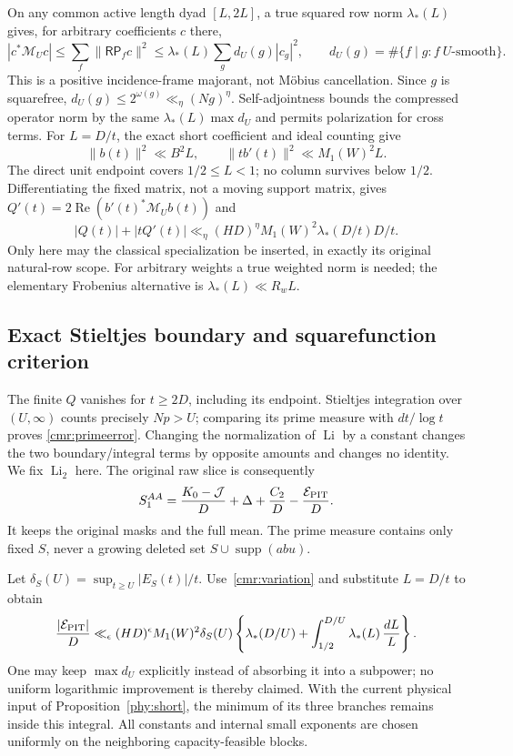 \documentclass[11pt]{article}
\theoremstyle{definition}\newtheorem{definition}[theorem]{Definition}
\theoremstyle{remark}\newtheorem{remark}[theorem]{Remark}
\begin{document}
On any common active length dyad $[L,2L]$, a true squared row norm
$\lambda_*(L)$ gives, for arbitrary coefficients $c$ there,
\[
 |c^*\mathcal M_Uc|
 \le\sum_f\|\mathsf R\mathsf P_fc\|^2
 \le\lambda_*(L)\sum_g d_U(g)|c_g|^2,
 \qquad d_U(g)=\#\{f\mid g:f\ U\text{-smooth}\}.
\]
This is a positive incidence-frame majorant, not M\"obius cancellation.
Since $g$ is squarefree, $d_U(g)\le2^{\omega(g)}\ll_\eta(Ng)^\eta$.
Self-adjointness bounds the compressed operator norm by the same
$\lambda_*(L)\max d_U$ and permits polarization for cross terms.
For $L=D/t$, the exact short coefficient and ideal counting give
\[
 \|b(t)\|^2\ll B^2L,\qquad
 \|tb'(t)\|^2\ll M_1(W)^2L.
\]
The direct unit endpoint covers $1/2\le L<1$; no column survives below
$1/2$. Differentiating the fixed matrix, not a moving support matrix,
gives $Q'(t)=2\operatorname{Re}(b'(t)^*\mathcal M_Ub(t))$ and
\begin{equation}\label{cmr:variation}
 |Q(t)|+|tQ'(t)|\ll_\eta(HD)^\eta
                     M_1(W)^2\lambda_*(D/t)D/t.
\end{equation}
Only here may the classical specialization be inserted, in exactly
its original natural-row scope. For arbitrary weights a true
weighted norm is needed; the elementary Frobenius alternative is
$\lambda_*(L)\ll R_wL$.

\subsection{Exact Stieltjes boundary and squarefunction criterion}
\label{cmr:stieltjes-proof}
The finite $Q$ vanishes for $t\ge2D$, including its endpoint.
Stieltjes integration over $(U,\infty)$ counts precisely $Np>U$;
comparing its prime measure with $dt/\log t$ proves
\eqref{cmr:primeerror}. Changing the normalization of $\operatorname{Li}$
by a constant changes the two boundary/integral terms by opposite
amounts and changes no identity. We fix $\operatorname{Li}_2$ here.
The original raw slice is consequently
\[
 S_1^{AA}=\frac{K_0-\mathcal J}D+\Delta+\frac{C_2}D
                                   -\frac{\mathcal E_{\rm PIT}}D.
\]
It keeps the original masks and the full mean. The prime measure
contains only fixed $S$, never a growing deleted set
$S\cup\operatorname{supp}(abu)$.

Let $\delta_S(U)=\sup_{t\ge U}|E_S(t)|/t$.
Use~\eqref{cmr:variation} and substitute $L=D/t$ to obtain
\begin{equation}\label{cmr:pointwise-budget}
 \frac{|\mathcal E_{\rm PIT}|}D
 \ll_\epsilon(HD)^\epsilon M_1(W)^2\delta_S(U)
 \left\{\lambda_*(D/U)+
        \int_{1/2}^{D/U}\lambda_*(L)\,\frac{dL}{L}\right\}.
\end{equation}
One may keep $\max d_U$ explicitly instead of absorbing it into a
subpower; no uniform logarithmic improvement is thereby claimed.
With the current physical input of Proposition~\ref{phy:short}, the minimum of
its three branches remains inside this integral. All constants and
internal small exponents are chosen uniformly on the neighboring
capacity-feasible blocks.
\end{document}
